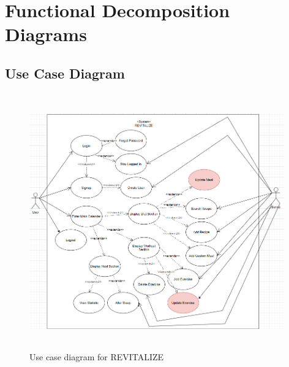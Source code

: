 \documentclass[12pt,letterpaper]{article}
\begin{document}
\section{Functional Decomposition Diagrams}
\subsection{Use Case Diagram}
\begin{figure}[H]
	\centering
	\includegraphics[width=11cm, height=11cm]{4G06SRSUseCaseDiagram.png}
	\caption{Use case diagram for REVITALIZE}
\end{figure}
\end{document}
